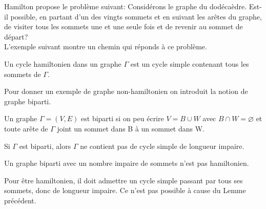 Hamilton propose le problème suivant: Considérons le graphe du dodécaèdre. Est-il possible, en partant d'un des vingts sommets et en suivant les arêtes du graphe, de visiter tous les sommets une et une seule fois et de revenir au sommet de départ? \\

L'exemple suivant montre un chemin qui réponds à ce problème. \\

\begin{exmp}

\end{exmp}



\begin{defn}
Un cycle hamiltonien dans un graphe $\Gamma$ est un cycle simple contenant tous les sommets de $\Gamma$. \\
\end{defn}

Pour donner un exemple de graphe non-hamiltonien on introduit la notion de graphe biparti. 

\begin{defn}
Un graphe $\Gamma = (V,E)$ est biparti si on peu écrire $V=B \cup W$ avec $B \cap W = \varnothing $ et toute arête de $\Gamma$ joint un sommet dans B à un sommet dans W.\\
\end{defn}

\begin{exmp}

\end{exmp}



\begin{lemme}
Si $\Gamma$ est biparti, alors $\Gamma$ ne contient pas de cycle simple de longueur impaire.
\end{lemme}

\begin{thrm}
Un graphe biparti avec un nombre impaire de sommets n'est pas hamiltonien.
\end{thrm}

\begin{demo}
Pour être hamiltonien, il doit admettre un cycle simple passant par tous ses sommets, donc de longueur impaire. Ce n'est pas possible à cause du Lemme précédent.
\end{demo}

